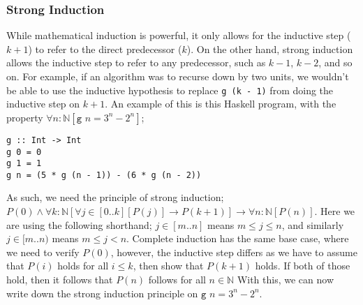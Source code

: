 \documentclass[a4paper, 12pt]{article}
\begin{document}
            \subsubsection*{Strong Induction}
                While mathematical induction is powerful, it only allows for the inductive step ($k + 1$) to refer to the direct predecessor ($k$). On the other hand, strong induction allows the inductive step to refer to any predecessor, such as $k - 1$, $k - 2$, and so on. For example, if an algorithm was to recurse down by two units, we wouldn't be able to use the inductive hypothesis to replace \texttt{g (k - 1)} from doing the inductive step on $k + 1$. An example of this is this Haskell program, with the property $\forall n : \mathbb{N} [\texttt{g } n = 3^n - 2^n]$;
                \begin{verbatim}
g :: Int -> Int
g 0 = 0
g 1 = 1
g n = (5 * g (n - 1)) - (6 * g (n - 2))\end{verbatim}
                As such, we need the principle of strong induction; $P(0) \land \forall k : \mathbb{N} [\forall j \in [0..k] [P(j)] \rightarrow P(k + 1)] \rightarrow \forall n : \mathbb{N} [P(n)]$. Here we are using the following shorthand; $j \in [m..n]$ means $m \leq j \leq n$, and similarly $j \in [m..n)$ means $m \leq j < n$. Complete induction has the same base case, where we need to verify $P(0)$, however, the inductive step differs as we have to assume that $P(i)$ holds for all $i \leq k$, then show that $P(k + 1)$ holds. If both of those hold, then it follows that $P(n)$ follows for all $n \in \mathbb{N}$ With this, we can now write down the strong induction principle on $\texttt{g } n = 3^n - 2^n$.
                \medskip
\end{document}
